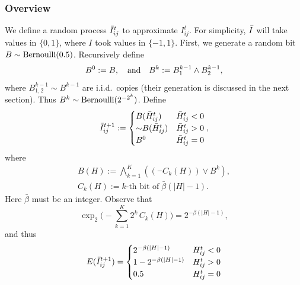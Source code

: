 \subsubsection{Overview}
We define a random process $\bar{I}_{ij}^t$ to approximate $I_{ij}^t$.  For simplicity,
$\bar{I}$ will take values in $\{0,1\}$, where $I$ took values in $\{-1,1\}$.
First, we generate a random bit $B \sim \operatorname{Bernoulli}(0.5)$. Recursively define
\begin{equation}
B^0 := B,\quad\text{and}\quad B^k := B^{k-1}_1\wedge B^{k-1}_2 ,
\end{equation}
where $B^{k-1}_{1,2} \sim B^{k-1}$ are i.i.d.\ copies (their generation is discussed in the next section).
Thus $B^k \sim \operatorname{Bernoulli}(2^{-2^k})$.
Define
\begin{equation}
 \bar{I}^{t+1}_{ij} := \begin{cases}
B(\bar H_{ij}^t) & \bar H_{ij}^t<0\\
\mathord{\sim} B(\bar H_{ij}^t) & \bar H_{ij}^t>0\\
B^0 & \bar H_{ij}^t=0
\end{cases},
\end{equation}
where
\begin{gather}
B(H) := \bigwedge_{k=1}^K((\neg C_k(H))\vee B^k),\\
C_k(H) := \text{$k$-th bit of}\; \bar{\beta}(|H|-1).
\end{gather}
Here $\bar\beta$ must be an integer. Observe that 
$$\exp_2\bigl(-\sum_{k=1}^K 2^k\,C_k(H)\bigr) =  2^{-\beta (|H|-1)},$$
and thus
\begin{equation}
E(\bar{I}^{t+1}_{ij}) = 
\begin{cases}
2^{-\beta (|H|-1)} & H_{ij}^t < 0\\
1-2^{-\beta (|H|-1)} & H_{ij}^t > 0\\
0.5 & H_{ij}^t = 0
\end{cases}
\end{equation}


